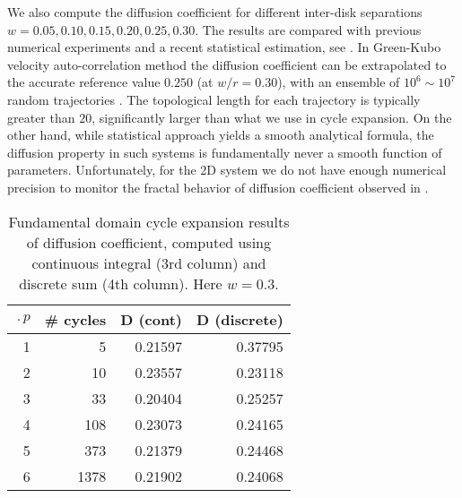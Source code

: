 We also compute the diffusion coefficient for different inter-disk
separations $w = 0.05, 0.10, 0.15,
0.20, 0.25, 0.30$. The results are compared with previous numerical
experiments and a recent statistical estimation, see
.
In Green-Kubo velocity auto-correlation method
the  diffusion coefficient can be extrapolated to the accurate
reference value $0.250$ (at $w/r=0.30$), with an ensemble of
$10^6\sim10^7$ random trajectories
. The topological length for each trajectory is
typically greater than $20$, significantly larger than what we use
in cycle expansion. On the other
hand, while
statistical approach yields a smooth analytical formula,
the diffusion property in such systems is fundamentally never a
smooth function of parameters. Unfortunately, for
the 2D system we do not have enough numerical precision to monitor
the fractal behavior of diffusion coefficient observed in
.

\begin{table}[htbp]
	\centering
	\begin{tabular}{|r|r|r|r||}
		\hline
		$\period{p}$ & \# cycles & D (cont) & D (discrete) \\
		\hline\hline
		1      & 5      & 0.21597 & 0.37795 \\
		2      & 10     & 0.23557 & 0.23118 \\
		3      & 33     & 0.20404 & 0.25257 \\
		4      & 108    & 0.23073 & 0.24165 \\
		5      & 373    & 0.21379 & 0.24468 \\
		6      & 1378   & 0.21902 & 0.24068 \\
		\hline
	\end{tabular}
	\caption[Fundamental domain cycle expansion results of diffusion
	coefficient]{\label{TCELL3}
		Fundamental domain cycle expansion results of diffusion
		coefficient, computed using continuous integral (3rd column)
		and discrete sum (4th column). Here $w = 0.3$.
	}
\end{table}

